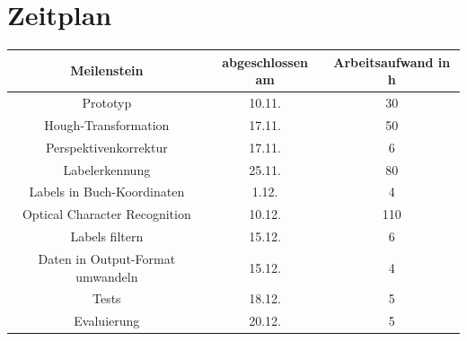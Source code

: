 \documentclass[deutsch]{scrartcl}
\begin{document}
\section{Zeitplan}
\begin{table}[H]
	\centering
		\begin{tabular}{|c|c|c|}
		\hline
		Meilenstein & abgeschlossen am & Arbeitsaufwand in h\\
		\hline
		Prototyp & 10.11. & 30\\
		\hline
		Hough-Transformation & 17.11. & 50\\
		\hline
		Perspektivenkorrektur & 17.11. & 6\\
		\hline
		Labelerkennung & 25.11. & 80\\
		\hline
		Labels in Buch-Koordinaten & 1.12. & 4\\
		\hline
		Optical Character Recognition & 10.12. & 110\\
		\hline
		Labels filtern & 15.12. & 6\\
		\hline
		Daten in Output-Format umwandeln & 15.12. & 4\\
		\hline
		Tests & 18.12. & 5\\
		\hline
		Evaluierung & 20.12. & 5 \\
		\hline
		\end{tabular}
\end{table}


\nocite{*}

\end{document}
